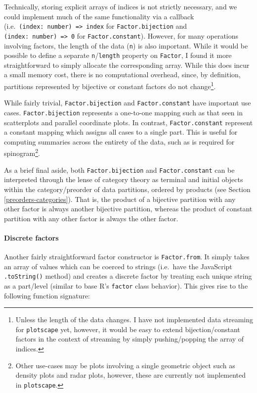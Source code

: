 \documentclass[
  openany]{book}
\theoremstyle{definition}
\theoremstyle{definition}
\theoremstyle{definition}
\theoremstyle{definition}
\theoremstyle{remark}
\begin{document}
Technically, storing explicit arrays of indices is not strictly necessary, and we could implement much of the same functionality via a callback (i.e.~\texttt{(index:\ number)\ =\textgreater{}\ index} for \texttt{Factor.bijection} and \texttt{(index:\ number)\ =\textgreater{}\ 0} for \texttt{Factor.constant}). However, for many operations involving factors, the length of the data (\texttt{n}) is also important. While it would be possible to define a separate \texttt{n}/\texttt{length} property on \texttt{Factor}, I found it more straightforward to simply allocate the corresponding array. While this does incur a small memory cost, there is no computational overhead, since, by definition, partitions represented by bijective or constant factors do not change\footnote{Unless the length of the data changes. I have not implemented data streaming for \texttt{plotscape} yet, however, it would be easy to extend bijection/constant factors in the context of streaming by simply pushing/popping the array of indices.}.

While fairly trivial, \texttt{Factor.bijection} and \texttt{Factor.constant} have important use cases. \texttt{Factor.bijection} represents a one-to-one mapping such as that seen in scatterplots and parallel coordinate plots. In contrast, \texttt{Factor.constant} represent a constant mapping which assigns all cases to a single part. This is useful for computing summaries across the entirety of the data, such as is required for spinogram\footnote{Other use-cases may be plots involving a single geometric object such as density plots and radar plots, however, these are currently not implemented in \texttt{plotscape}.}.

As a brief final aside, both \texttt{Factor.bijection} and \texttt{Factor.constant} can be interpreted through the lense of category theory as terminal and initial objects within the category/preorder of data partitions, ordered by products (see Section \ref{preorders-categories}). That is, the product of a bijective partition with any other factor is always another bijective partition, whereas the product of constant partition with any other factor is always the other factor.

\paragraph{Discrete factors}\label{discrete-factors}

Another fairly straightforward factor constructor is \texttt{Factor.from}. It simply takes an array of values which can be coerced to strings (i.e.~have the JavaScript \texttt{.toString()} method) and creates a discrete factor by treating each unique string as a part/level (similar to base R's \texttt{factor} class behavior). This gives rise to the following function signature:
\end{document}
